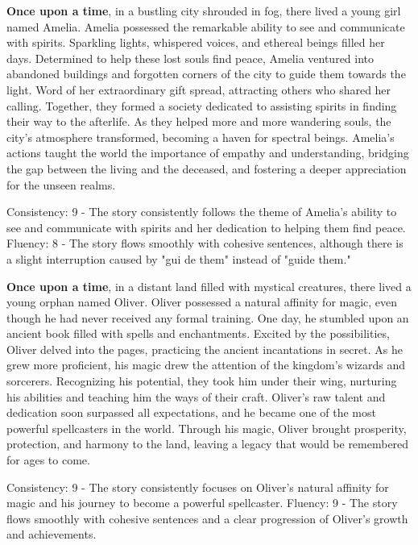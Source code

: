 \documentclass{article}
\begin{document}
\textbf{Once upon a time}, in a bustling city shrouded in fog, there lived a young girl named Amelia. Amelia possessed the remarkable ability to see and communicate with spirits. Sparkling lights, whispered voices, and ethereal beings filled her days. Determined to help these lost souls find peace, Amelia ventured into abandoned buildings and forgotten corners of the city to guide them towards the light. Word of her extraordinary gift spread, attracting others who shared her calling. Together, they formed a society dedicated to assisting spirits in finding their way to the afterlife. As they helped more and more wandering souls, the city's atmosphere transformed, becoming a haven for spectral beings. Amelia's actions taught the world the importance of empathy and understanding, bridging the gap between the living and the deceased, and fostering a deeper appreciation for the unseen realms.

Consistency: 9 - The story consistently follows the theme of Amelia's ability to see and communicate with spirits and her dedication to helping them find peace.
Fluency: 8 - The story flows smoothly with cohesive sentences, although there is a slight interruption caused by "gui de them" instead of "guide them."

\textbf{Once upon a time}, in a distant land filled with mystical creatures, there lived a young orphan named Oliver. Oliver possessed a natural affinity for magic, even though he had never received any formal training. One day, he stumbled upon an ancient book filled with spells and enchantments. Excited by the possibilities, Oliver delved into the pages, practicing the ancient incantations in secret. As he grew more proficient, his magic drew the attention of the kingdom's wizards and sorcerers. Recognizing his potential, they took him under their wing, nurturing his abilities and teaching him the ways of their craft. Oliver's raw talent and dedication soon surpassed all expectations, and he became one of the most powerful spellcasters in the world. Through his magic, Oliver brought prosperity, protection, and harmony to the land, leaving a legacy that would be remembered for ages to come.

Consistency: 9 - The story consistently focuses on Oliver's natural affinity for magic and his journey to become a powerful spellcaster.
Fluency: 9 - The story flows smoothly with cohesive sentences and a clear progression of Oliver's growth and achievements.
\end{document}
